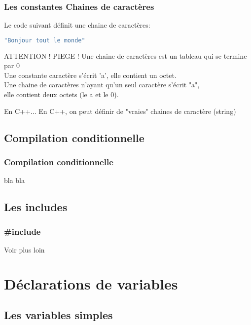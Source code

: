 \documentclass{beamer}
\begin{document}
\begin{frame}[fragile=singleslide,shrink=20]
\frametitle {Les constantes Chaines de caractères}
Le code suivant définit une chaine de caractères:
\begin{lstlisting}[language=c++]
"Bonjour tout le monde"
\end{lstlisting}

\begin{block}{ATTENTION ! PIEGE !}
Une chaine de caractères est un tableau qui se termine par 0 \\
Une constante caractère s'écrit 'a', elle contient un octet.\\
Une chaine de caractères n'ayant qu'un seul caractère s'écrit "a", \\
elle contient deux octets (le a et le 0).
\end{block}

\begin{block}{En C++...}
En C++, on peut définir de "vraies" chaines de caractère (string)
\end{block}

\end{frame}

\subsection{Compilation conditionnelle}

\begin{frame}[fragile=singleslide,shrink=20]
\frametitle {Compilation conditionnelle}
bla bla
\end{frame}

\subsection{Les includes}

\begin{frame}[fragile=singleslide,shrink=20]
\frametitle {\#include}
Voir plus loin
\end{frame}

\section{Déclarations de variables}

\subsection{Les variables simples}
\end{document}
